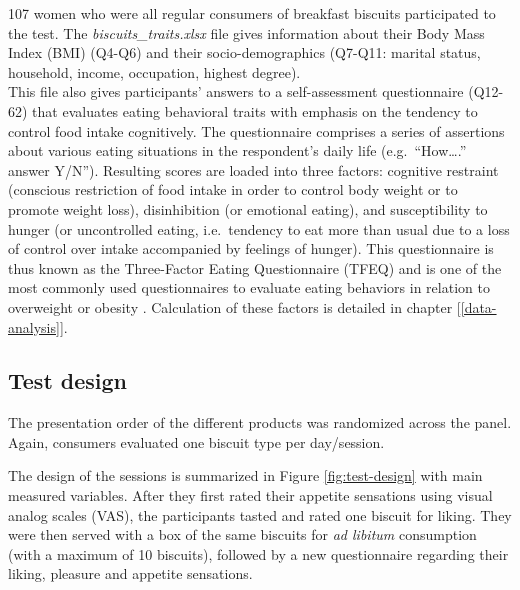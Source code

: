 \documentclass[
]{krantz}
\begin{document}
107 women who were all regular consumers of breakfast biscuits participated to the test. The \emph{biscuits\_traits.xlsx} file gives information about their Body Mass Index (BMI) (Q4-Q6) and their socio-demographics (Q7-Q11: marital status, household, income, occupation, highest degree).\\
This file also gives participants' answers to a self-assessment questionnaire (Q12-62) that evaluates eating behavioral traits with emphasis on the tendency to control food intake cognitively. The questionnaire comprises a series of assertions about various eating situations in the respondent's daily life (e.g.~``How\ldots.'' answer Y/N''). Resulting scores are loaded into three factors: cognitive restraint (conscious restriction of food intake in order to control body weight or to promote weight loss), disinhibition (or emotional eating), and susceptibility to hunger (or uncontrolled eating, i.e.~tendency to eat more than usual due to a loss of control over intake accompanied by feelings of hunger). This questionnaire is thus known as the Three-Factor Eating Questionnaire (TFEQ) \citep{stunkard1985} and is one of the most commonly used questionnaires to evaluate eating behaviors in relation to overweight or obesity \citep{blundell2010}. Calculation of these factors is detailed in chapter {[}\ref{data-analysis}{]}.

\hypertarget{test-design}{%
\subsection{Test design}\label{test-design}}

The presentation order of the different products was randomized across the panel. Again, consumers evaluated one biscuit type per day/session.

The design of the sessions is summarized in Figure \ref{fig:test-design} with main measured variables. After they first rated their appetite sensations using visual analog scales (VAS), the participants tasted and rated one biscuit for liking. They were then served with a box of the same biscuits for \emph{ad libitum} consumption (with a maximum of 10 biscuits), followed by a new questionnaire regarding their liking, pleasure and appetite sensations.
\end{document}

